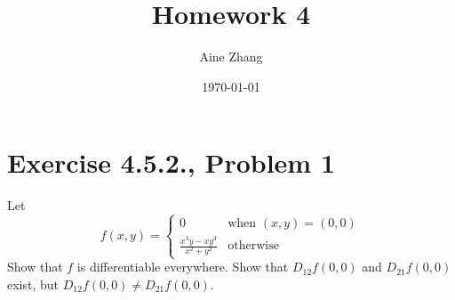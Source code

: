 \documentclass{article}
\title{Homework 4}
\author{Aine Zhang}
\date\today
\begin{document}
\maketitle %

\section*{Exercise 4.5.2., Problem 1}
Let 
$$f (x, y) =
\begin{cases}
    0 & \text{when } (x,y)=(0,0)\\
    \frac{x^3y-xy^3}{x^2+y^2} & \text{otherwise}
\end{cases}$$ 
Show that $f$ is differentiable everywhere. Show that $D_{12}f (0, 0)$ and $D_{21}f (0, 0)$ exist, but $D_{12}f (0, 0) \neq
D_{21}f (0, 0).$
\end{document}
